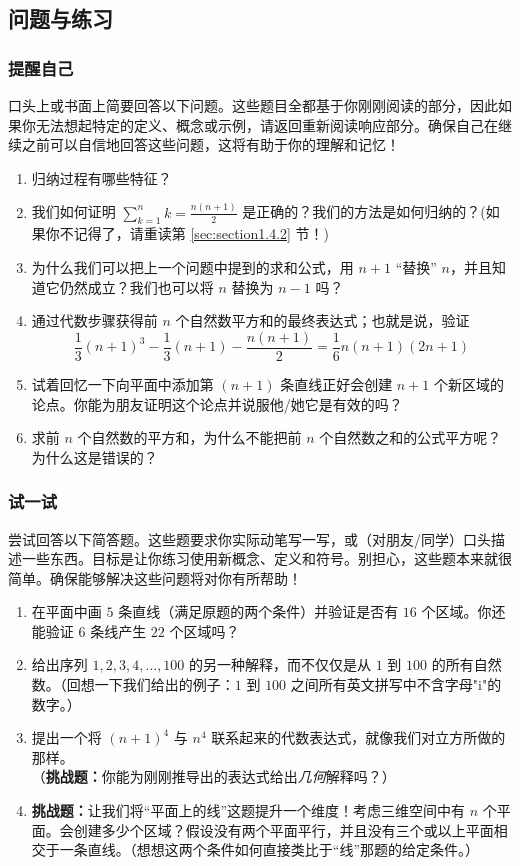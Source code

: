 \subsection{问题与练习}

\subsubsection*{提醒自己}

口头上或书面上简要回答以下问题。这些题目全都基于你刚刚阅读的部分，因此如果你无法想起特定的定义、概念或示例，请返回重新阅读响应部分。确保自己在继续之前可以自信地回答这些问题，这将有助于你的理解和记忆！

\begin{enumerate}[label=(\arabic*)]
    \item 归纳过程有哪些特征？
    \item 我们如何证明 $\sum_{k=1}^{n}k = \frac{n(n+1)}{2}$ 是正确的？我们的方法是如何归纳的？(如果你不记得了，请重读第 \ref{sec:section1.4.2} 节！)
    \item 为什么我们可以把上一个问题中提到的求和公式，用 $n+1$ “替换” $n$，并且知道它仍然成立？我们也可以将 $n$ 替换为 $n - 1$ 吗？
    \item 通过代数步骤获得前 $n$ 个自然数平方和的最终表达式；也就是说，验证
    \[\frac{1}{3}(n+1)^3-\frac{1}{3}(n+1)-\frac{n(n+1)}{2} = \frac{1}{6}n(n+1)(2n+1)\]
    \item 试着回忆一下向平面中添加第 $(n+1)$ 条直线正好会创建 $n+1$ 个新区域的论点。你能为朋友证明这个论点并说服他/她它是有效的吗？
    \item 求前 $n$ 个自然数的平方和，为什么不能把前 $n$ 个自然数之和的公式平方呢？为什么这是错误的？
\end{enumerate}

\subsubsection*{试一试}

尝试回答以下简答题。这些题要求你实际动笔写一写，或（对朋友/同学）口头描述一些东西。目标是让你练习使用新概念、定义和符号。别担心，这些题本来就很简单。确保能够解决这些问题将对你有所帮助！

\begin{enumerate}[label=(\arabic*)]
    \item 在平面中画 $5$ 条直线（满足原题的两个条件）并验证是否有 $16$ 个区域。你还能验证 $6$ 条线产生 $22$ 个区域吗？
    \item 给出序列 $1, 2, 3, 4, \dots , 100$ 的另一种解释，而不仅仅是从 $1$ 到 $100$ 的所有自然数。（回想一下我们给出的例子：$1$ 到 $100$ 之间所有英文拼写中不含字母"i"的数字。）
    \item 提出一个将 $(n + 1)^4$ 与 $n^4$ 联系起来的代数表达式，就像我们对立方所做的那样。\\ 
    （\textbf{挑战题：}你能为刚刚推导出的表达式给出\textit{几何}解释吗？）
    \item \textbf{挑战题：}让我们将“平面上的线”这题提升一个维度！考虑三维空间中有 $n$ 个平面。会创建多少个区域？假设没有两个平面平行，并且没有三个或以上平面相交于一条直线。（想想这两个条件如何直接类比于“线”那题的给定条件。）
\end{enumerate}